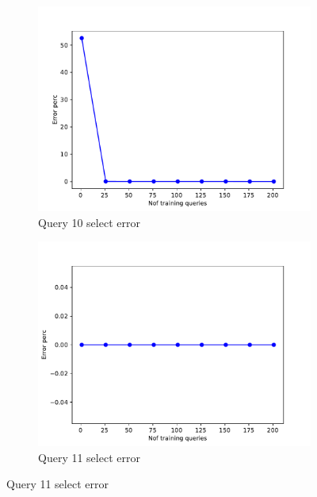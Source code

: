 \begin{figure}[!htb]
  \begin{subfigure}[t]{0.5\textwidth}
    \includegraphics[scale=0.4]{figs/tpch10/tpch10_sel10_error.pdf}
    \caption{Query 10 select error}
    \label{fig:tpch_sel10}
  \end{subfigure}
  \begin{subfigure}[t]{0.5\textwidth}
    \includegraphics[scale=0.4]{figs/tpch10/tpch10_sel11_error.pdf}
    \caption{Query 11 select error}
    \label{fig:tpch_sel11}
   \end{subfigure}


\end{figure}
